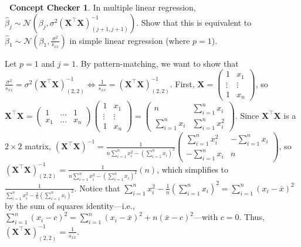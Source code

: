 \documentclass[12pt,oneside]{article}
\newcommand{\N}{\mathcal{N}}
\theoremstyle{definition}
\newtheorem{concept}{\faPen \ Concept Checker}
\theoremstyle{remark}
\begin{document}
\begin{concept}
In multiple linear regression, $\hat{\beta}_j \sim \N \left( \beta_j, \sigma^2 (\boldsymbol{X}^{\top} \boldsymbol{X})^{-1}_{(j + 1, j + 1)} \right)$. Show that this is equivalent to $\hat{\beta}_{1} \sim \N \left( \beta_1, \frac{\sigma^2}{s_{xx}} \right)$ in simple linear regression (where $p = 1$).
\end{concept}

\begin{solutionbox}
Let $p = 1$ and $j = 1$. By pattern-matching, we want to show that $\frac{\sigma^2}{s_{xx}} = \sigma^2 (\boldsymbol{X}^{\top} \boldsymbol{X})^{-1}_{(2, 2)} \iff \frac{1}{s_{xx}} = (\boldsymbol{X}^{\top} \boldsymbol{X})^{-1}_{(2, 2)}$. First, $\boldsymbol{X} = 
\begin{pmatrix}
1 & x_{1} \\
\vdots & \vdots \\
1 & x_{n}
\end{pmatrix}$, so $\boldsymbol{X}^{\top} \boldsymbol{X} = 
\begin{pmatrix}
1 & \ldots & 1 \\
x_{1} & \ldots & x_{n}
\end{pmatrix}
\begin{pmatrix}
1 & x_{1} \\
\vdots & \vdots \\
1 & x_{n}
\end{pmatrix} =
\begin{pmatrix}
n & \sum_{i = 1}^{n} x_{i} \\
\sum_{i = 1}^{n} x_{i} & \sum_{i = 1}^{n} x_{i}^2
\end{pmatrix}$. Since $\boldsymbol{X}^{\top} \boldsymbol{X}$ is a $2 \times 2$ matrix, $(\boldsymbol{X}^{\top} \boldsymbol{X})^{-1} = 
\frac{1}{n \sum_{i = 1}^{n} x_{i}^2 - (\sum_{i = 1}^{n} x_{i})^2}
\begin{pmatrix}
\sum_{i = 1}^{n} x_{i}^2 & - \sum_{i = 1}^{n} x_{i} \\
- \sum_{i = 1}^{n} x_{i} & n
\end{pmatrix}$, so $(\boldsymbol{X}^{\top} \boldsymbol{X})^{-1}_{(2, 2)} = \frac{1}{n \sum_{i = 1}^{n} x_{i}^2 - (\sum_{i = 1}^{n} x_{i})^2} (n)$, which simplifies to $\frac{1}{\sum_{i = 1}^{n} x_{i}^2 - \frac{1}{n} (\sum_{i = 1}^{n} x_{i})^2}$. Notice that $\sum_{i = 1}^{n} x_{i}^2 - \frac{1}{n} (\sum_{i = 1}^{n} x_{i})^2 = \sum_{i = 1}^{n} (x_i - \bar{x})^2$ by the sum of squares identity—i.e., $\sum_{i = 1}^{n} (x_i - c)^2 = \sum_{i = 1}^{n} (x_i - \bar{x})^2 + n(\bar{x} - c)^2$—with $c = 0$. Thus, $(\boldsymbol{X}^{\top} \boldsymbol{X})^{-1}_{(2, 2)} = \frac{1}{s_{xx}}$.
\end{solutionbox}
\end{document}
